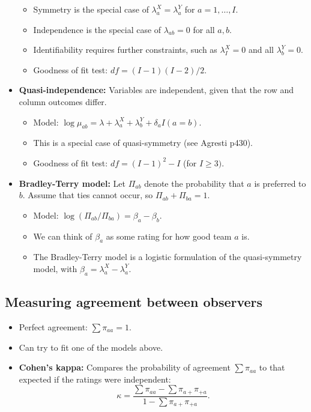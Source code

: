 \documentclass[twoside]{article}
\newcommand\dlt{\delta}
\newcommand\lmb{\lambda}
\begin{document}
\begin{itemize}
\begin{itemize}
\item Symmetry is the special case of $\lmb_a^X = \lmb_a^Y$ for $a = 1, \dots, I$.

\item Independence is the special case of $\lmb_{ab} = 0$ for all $a, b$.

\item Identifiability requires further constraints, such as $\lmb_I^X = 0$ and all $\lmb_b^Y = 0$.

\item Goodness of fit test: $df = (I-1)(I-2)/2$.
\end{itemize}

\item \textbf{Quasi-independence:} Variables are independent, given that the row and column outcomes differ.
\begin{itemize}
\item Model: $\log \mu_{ab} = \lmb + \lmb_a^X + \lmb_b^Y + \dlt_a I(a=b)$.

\item This is a special case of quasi-symmetry (see Agresti p430).

\item Goodness of fit test: $df = (I-1)^2 - I$ (for $I \geq 3)$.
\end{itemize}

\item \textbf{Bradley-Terry model:} Let $\Pi_{ab}$ denote the probability that $a$ is preferred to $b$. Assume that ties cannot occur, so $\Pi_{ab} + \Pi_{ba} = 1$.
\begin{itemize}
\item Model: $\log (\Pi_{ab}/\Pi_{ba}) = \beta_a - \beta_b$.

\item We can think of $\beta_a$ as some rating for how good team $a$ is.

\item The Bradley-Terry model is a logistic formulation of the quasi-symmetry model, with $\beta_a = \lmb_a^X - \lmb_a^Y$.
\end{itemize}

\end{itemize}

\subsection*{Measuring agreement between observers}
\begin{itemize}
\item Perfect agreement: $\sum \pi_{aa} = 1$.

\item Can try to fit one of the models above.

\item \textbf{Cohen's kappa:} Compares the probability of agreement $\sum \pi_{aa}$ to that expected if the ratings were independent:
\[\kappa = \frac{\sum \pi_{aa} - \sum \pi_{a+}\pi_{+a} }{1 - \sum \pi_{a+}\pi_{+a}}. \]
\end{itemize}
\end{document}
